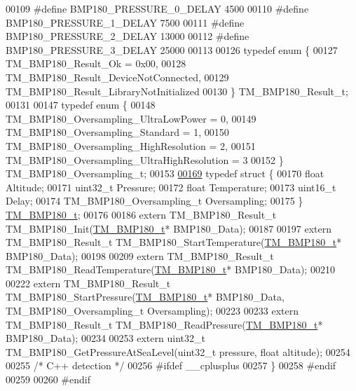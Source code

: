 \begin{DoxyCode}
00109 \textcolor{preprocessor}{#define BMP180\_PRESSURE\_0\_DELAY     4500}
00110 \textcolor{preprocessor}{#define BMP180\_PRESSURE\_1\_DELAY     7500}
00111 \textcolor{preprocessor}{#define BMP180\_PRESSURE\_2\_DELAY     13000}
00112 \textcolor{preprocessor}{#define BMP180\_PRESSURE\_3\_DELAY     25000}
00113 
00126 \textcolor{keyword}{typedef} \textcolor{keyword}{enum} \{
00127     TM\_BMP180\_Result\_Ok = 0x00,
00128     TM\_BMP180\_Result\_DeviceNotConnected,
00129     TM\_BMP180\_Result\_LibraryNotInitialized
00130 \} TM\_BMP180\_Result\_t;
00131 
00147 \textcolor{keyword}{typedef} \textcolor{keyword}{enum} \{
00148     TM\_BMP180\_Oversampling\_UltraLowPower = 0,
00149     TM\_BMP180\_Oversampling\_Standard = 1,
00150     TM\_BMP180\_Oversampling\_HighResolution = 2,
00151     TM\_BMP180\_Oversampling\_UltraHighResolution = 3
00152 \} TM\_BMP180\_Oversampling\_t;
00153 
\hypertarget{tm__stm32f4__bmp180_8h_source_l00169}{}\hyperlink{struct_t_m___b_m_p180__t}{00169} \textcolor{keyword}{typedef} \textcolor{keyword}{struct }\{
00170     \textcolor{keywordtype}{float} Altitude;
00171     uint32\_t Pressure;
00172     \textcolor{keywordtype}{float} Temperature;
00173     uint16\_t Delay;
00174     TM\_BMP180\_Oversampling\_t Oversampling;
00175 \} \hyperlink{struct_t_m___b_m_p180__t}{TM\_BMP180\_t};
00176 
00186 \textcolor{keyword}{extern} TM\_BMP180\_Result\_t TM\_BMP180\_Init(\hyperlink{struct_t_m___b_m_p180__t}{TM\_BMP180\_t}* BMP180\_Data);
00187 
00197 \textcolor{keyword}{extern} TM\_BMP180\_Result\_t TM\_BMP180\_StartTemperature(\hyperlink{struct_t_m___b_m_p180__t}{TM\_BMP180\_t}* BMP180\_Data);
00198 
00209 \textcolor{keyword}{extern} TM\_BMP180\_Result\_t TM\_BMP180\_ReadTemperature(\hyperlink{struct_t_m___b_m_p180__t}{TM\_BMP180\_t}* BMP180\_Data);
00210 
00222 \textcolor{keyword}{extern} TM\_BMP180\_Result\_t TM\_BMP180\_StartPressure(\hyperlink{struct_t_m___b_m_p180__t}{TM\_BMP180\_t}* BMP180\_Data, 
      TM\_BMP180\_Oversampling\_t Oversampling);
00223 
00233 \textcolor{keyword}{extern} TM\_BMP180\_Result\_t TM\_BMP180\_ReadPressure(\hyperlink{struct_t_m___b_m_p180__t}{TM\_BMP180\_t}* BMP180\_Data);
00234 
00253 \textcolor{keyword}{extern} uint32\_t TM\_BMP180\_GetPressureAtSeaLevel(uint32\_t pressure, \textcolor{keywordtype}{float} altitude);
00254 
00255 \textcolor{comment}{/* C++ detection */}
00256 \textcolor{preprocessor}{#ifdef \_\_cplusplus}
00257 \}
00258 \textcolor{preprocessor}{#endif}
00259 
00260 \textcolor{preprocessor}{#endif}
\end{DoxyCode}
